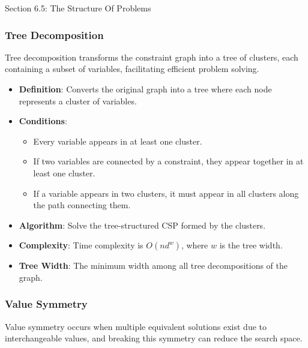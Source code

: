 \begin{notes}{Section 6.5: The Structure Of Problems}
\begin{highlight}
    \end{highlight}
    
    \subsubsection*{Tree Decomposition}
    
    Tree decomposition transforms the constraint graph into a tree of clusters, each containing a subset of variables, facilitating efficient problem solving.
    
    \begin{highlight}
    
        \begin{itemize}
            \item \textbf{Definition}: Converts the original graph into a tree where each node represents a cluster of variables.
            \item \textbf{Conditions}:
                \begin{itemize}
                    \item Every variable appears in at least one cluster.
                    \item If two variables are connected by a constraint, they appear together in at least one cluster.
                    \item If a variable appears in two clusters, it must appear in all clusters along the path connecting them.
                \end{itemize}
            \item \textbf{Algorithm}: Solve the tree-structured CSP formed by the clusters.
            \item \textbf{Complexity}: Time complexity is $O(nd^w)$, where $w$ is the tree width.
            \item \textbf{Tree Width}: The minimum width among all tree decompositions of the graph.
        \end{itemize}
    
    \end{highlight}
    
    \subsubsection*{Value Symmetry}
    
    Value symmetry occurs when multiple equivalent solutions exist due to interchangeable values, and breaking this symmetry can reduce the search space.
    

\end{notes}
